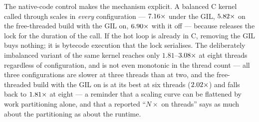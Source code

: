 The native-code control makes the mechanism explicit. A balanced C kernel called through
 scales in \emph{every} configuration --- $\meas{ratio:b4_threads-gil:c_ffi_uniform/gil/T1|b4_threads-gil:c_ffi_uniform/gil/T8}{7.16}\times$ under the GIL, $\meas{ratio:b4_threads-ft_gil:c_ffi_uniform/ft_gil/T1|b4_threads-ft_gil:c_ffi_uniform/ft_gil/T8}{5.82}\times$
on the free-threaded build with the GIL on, $\meas{ratio:b4_threads-ft:c_ffi_uniform/ft/T1|b4_threads-ft:c_ffi_uniform/ft/T8}{6.90}\times$ with it off --- because 
releases the lock for the duration of the call. If the hot loop is already in C, removing the
GIL buys nothing; it is bytecode execution that the lock serialises. The deliberately
imbalanced variant of the same kernel reaches only $1.81$--$\meas{ratio:b4_threads-gil:c_ffi_mandelbrot/gil/T1_control|b4_threads-gil:c_ffi_mandelbrot/gil/T8}{3.08}\times$ at eight threads
regardless of configuration, and is not even monotonic in the thread count --- all three
configurations are slower at three threads than at two, and the free-threaded build with the
GIL on is at its best at six threads ($\meas{ratio:b4_threads-ft_gil:c_ffi_mandelbrot/ft_gil/T1_control|b4_threads-ft_gil:c_ffi_mandelbrot/ft_gil/T6}{2.02}\times$) and falls back to $\meas{ratio:b4_threads-ft_gil:c_ffi_mandelbrot/ft_gil/T1_control|b4_threads-ft_gil:c_ffi_mandelbrot/ft_gil/T8}{1.81}\times$ at eight ---
a reminder that a scaling curve can be flattened by work
partitioning alone, and that a reported ``$N\times$ on threads'' says as much about the
partitioning as about the runtime.

